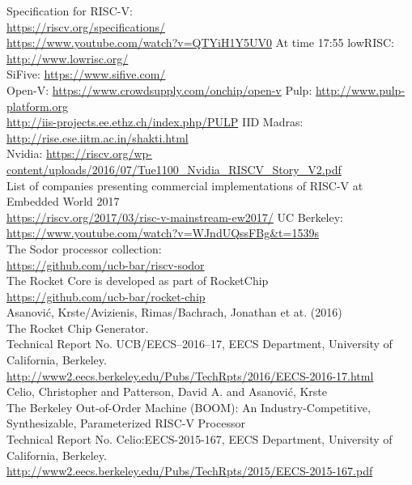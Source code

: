 \documentclass[journal,a4paper]{IEEEtran}
\begin{document}
\begin{thebibliography}{1}
		Specification for RISC-V:\\
		\url{https://riscv.org/specifications/}\\
		\url{https://www.youtube.com/watch?v=QTYiH1Y5UV0} At time 17:55
		lowRISC: \url{http://www.lowrisc.org/}\\
		SiFive: \url{https://www.sifive.com/}\\
		Open-V: \url{https://www.crowdsupply.com/onchip/open-v}
		Pulp: \url{http://www.pulp-platform.org}\\
		\url{http://iis-projects.ee.ethz.ch/index.php/PULP}
		IID Madras: \url{http://rise.cse.iitm.ac.in/shakti.html}\\
		Nvidia: \url{https://riscv.org/wp-content/uploads/2016/07/Tue1100_Nvidia_RISCV_Story_V2.pdf}\\
		List of companies presenting commercial implementations of RISC-V at Embedded World 2017\\
		\url{https://riscv.org/2017/03/risc-v-mainstream-ew2017/}
		UC Berkeley: \url{https://www.youtube.com/watch?v=WJndUQssFBg&t=1539s}\\
		The Sodor processor collection:\\
		\url{https://github.com/ucb-bar/riscv-sodor}\\
		The Rocket Core is developed as part of RocketChip\\
		\url{https://github.com/ucb-bar/rocket-chip}\\
		Asanović, Krste/Avizienis, Rimas/Bachrach, Jonathan et at. (2016)\\
		The Rocket Chip Generator.\\
		Technical Report No. UCB/EECS--2016--17, EECS Department, University of California, Berkeley.\\
		\url{http://www2.eecs.berkeley.edu/Pubs/TechRpts/2016/EECS-2016-17.html}\\
		Celio, Christopher and Patterson, David A. and Asanović, Krste\\
		The Berkeley Out-of-Order Machine (BOOM): An Industry-Competitive, Synthesizable, Parameterized RISC-V Processor\\
		Technical Report No. Celio:EECS-2015-167, EECS Department, University of California, Berkeley.\\
		\url{http://www2.eecs.berkeley.edu/Pubs/TechRpts/2015/EECS-2015-167.pdf}\\


\end{thebibliography}
\end{document}

